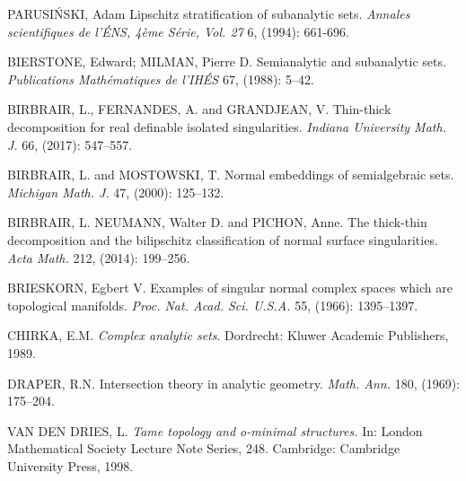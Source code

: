 \documentclass{amsart}
\begin{document}
\begin{thebibliography}{00}


{PARUSI\'NSKI, Adam}  
{Lipschitz stratification of subanalytic sets}.
{\it Annales scientifiques de l'\'ENS, 
4\`eme S\'erie, Vol. 27} 6, (1994): 661-696.
  
{BIERSTONE, Edward; MILMAN, Pierre D.}
{Semianalytic and subanalytic sets}.
{\it Publications Math\'ematiques de l'IH\'ES} 67, (1988): 5--42.

{BIRBRAIR, L., FERNANDES, A. and GRANDJEAN, V.}
{Thin-thick decomposition for real definable isolated singularities}.
{\it Indiana University Math. J.} 66, (2017): 547--557.

BIRBRAIR, L. and MOSTOWSKI, T.
{ Normal embeddings of semialgebraic sets}.
{\it Michigan Math. J.} 47, (2000): 125--132.

BIRBRAIR, L. NEUMANN, Walter D. and PICHON, Anne. {The thick-thin decomposition and the bilipschitz classification
    of normal surface singularities}.
  {\it Acta Math.} 212, (2014): 199--256. 

BRIESKORN, Egbert V.
{ Examples of singular normal complex spaces which are topological manifolds}.
{\it Proc. Nat. Acad. Sci. U.S.A.} 55, (1966): 1395--1397.

CHIRKA, E.M.
{\em Complex analytic sets}.
Dordrecht: Kluwer Academic Publishers, 1989.

{DRAPER, R.N.}
{Intersection theory in analytic geometry}.
{\it Math. Ann.} 180, (1969): 175--204.

{VAN DEN DRIES, L.}
{\em Tame topology and o-minimal structures.}
 In: London Mathematical Society Lecture Note Series, 248. Cambridge: Cambridge University Press, 1998.


\end{thebibliography}
\end{document}
